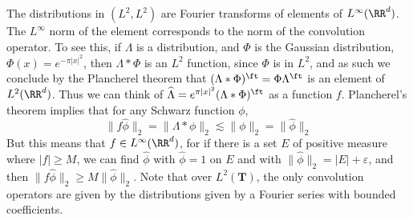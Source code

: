 \begin{example}
    The distributions in $(L^2, L^2)$ are Fourier transforms of elements of $L^\infty(\RR^d)$. The $L^\infty$ norm of the element corresponds to the norm of the convolution operator. To see this, if $\Lambda$ is a distribution, and $\Phi$ is the Gaussian distribution, $\Phi(x) = e^{-\pi|x|^2}$, then $\Lambda * \Phi$ is an $L^2$ function, since $\Phi$ is in $L^2$, and as such we conclude by the Plancherel theorem that $(\Lambda * \Phi)^\ft = \Phi \Lambda^\ft$ is an element of $L^2(\RR^d)$. Thus we can think of $\widehat{\Lambda} = e^{\pi |x|^2} (\Lambda * \Phi)^\ft$ as a function $f$. Plancherel's theorem implies that for any Schwarz function $\phi$,
    \[ \| f \widehat{\phi} \|_2 = \| \Lambda * \phi \|_2 \lesssim \| \phi \|_2 = \| \widehat{\phi} \|_2 \]
    But this means that $f \in L^\infty(\RR^d)$, for if there is a set $E$ of positive measure where $|f| \geq M$, we can find $\widehat{\phi}$ with $\widehat{\phi} = 1$ on $E$ and with $\| \widehat{\phi} \|_2 = |E| + \varepsilon$, and then $\| f \widehat{\phi} \|_2 \geq M \| \widehat{\phi} \|_2$. Note that over $L^2(\mathbf{T})$, the only convolution operators are given by the distributions given by a Fourier series with bounded coefficients.
\end{example}

